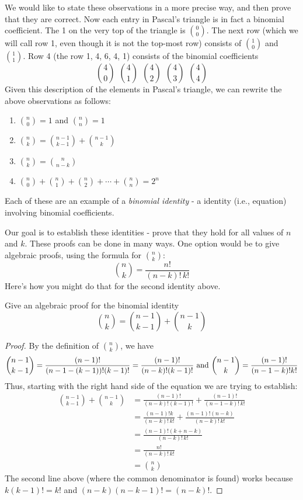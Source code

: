 \documentclass[12pt]{article}
\begin{document}
We would like to state these observations in a more precise way, and then prove that they are correct.  Now each entry in Pascal's triangle is in fact a binomial coefficient.  The 1 on the very top of the triangle is ${0 \choose 0}$.  The next row (which we will call row 1, even though it is not the top-most row) consists of ${1 \choose 0}$ and ${1 \choose 1}$.  Row 4 (the row 1, 4, 6, 4, 1) consists of the binomial coefficients
\[{4 \choose 0} ~~ {4 \choose 1} ~~ {4 \choose 2} ~~ {4 \choose 3} ~~ {4 \choose 4}\]
Given this description of the elements in Pascal's triangle, we can rewrite the above observations as follows:
\begin{enumerate}
  \item ${n \choose 0} = 1$ and ${n \choose n} = 1$
  \item ${n \choose k} = {n-1 \choose k-1} + {n-1 \choose k}$
  \item ${n \choose k} = {n \choose n-k}$
  \item ${n\choose 0} + {n \choose 1} + {n \choose 2} + \cdots + {n \choose n} = 2^n$
\end{enumerate}

Each of these are an example of a {\em binomial identity} - a identity (i.e., equation) involving binomial coefficients.

Our goal is to establish these identities - prove that they hold for all values of $n$ and $k$.  These proofs can be done in many ways.  One option would be to give algebraic proofs, using the formula for ${n \choose k}$:
\[{n \choose k} = \frac{n!}{(n-k)!\,k!}\]
Here's how you might do that for the second identity above.

\begin{example}
  Give an algebraic proof for the binomial identity
  \[{n \choose k} = {n-1\choose k-1} + {n-1 \choose k}\]
  \begin{proof}
    By the definition of ${n \choose k}$, we have
    \[{n-1 \choose k-1} = \frac{(n-1)!}{(n-1-(k-1))!(k-1)!} = \frac{(n-1)!}{(n-k)!(k-1)!} \hfill \mbox{ and } {n-1 \choose k} = \frac{(n-1)!}{(n-1-k)!k!}\]
    Thus, starting with the right hand side of the equation we are trying to establish:
    \begin{align*}
      {n-1 \choose k-1} + {n-1 \choose k} & = \frac{(n-1)!}{(n-k)!(k-1)!}+ \frac{(n-1)!}{(n-1-k)!\,k!}\\
      & = \frac{(n-1)!k}{(n-k)!\,k!} + \frac{(n-1)!(n-k)}{(n-k)!\,k!}\\
      & = \frac{(n-1)!(k+n-k)}{(n-k)!\,k!} \\
      & = \frac{n!}{(n-k)!\, k!} \\
      & = {n \choose k}
    \end{align*}
    The second line above (where the common denominator is found) works because $k(k-1)! = k!$ and $(n-k)(n-k-1)! = (n-k)!$.
  \end{proof}

\end{example}
\end{document}
